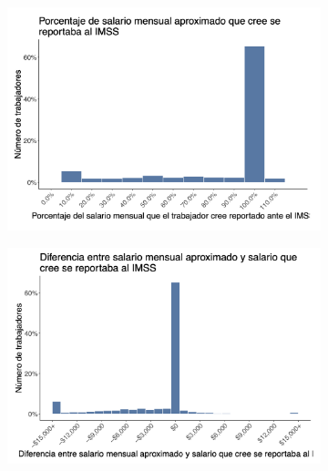 \documentclass[oneside,11pt]{article}
\begin{document}
\begin{figure}[H]
\begin{center}
    \begin{subfigure}{0.49\textwidth}
    \includegraphics[width=\textwidth]{04_Figures/workey_survey/Exp_9.png}
    \end{subfigure}
    \begin{subfigure}{0.49\textwidth}
    \includegraphics[width=\textwidth]{04_Figures/workey_survey/Exp_10.png}
    \end{subfigure}
    

\end{center}
\end{figure}
\end{document}
